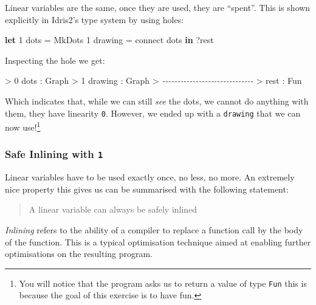 \documentclass[
]{article}
\newenvironment{Shaded}{}{}
\newcommand{\CommentTok}[1]{\textcolor[rgb]{0.38,0.63,0.69}{\textit{#1}}}
\newcommand{\DataTypeTok}[1]{\textcolor[rgb]{0.56,0.13,0.00}{#1}}
\newcommand{\DecValTok}[1]{\textcolor[rgb]{0.25,0.63,0.44}{#1}}
\newcommand{\KeywordTok}[1]{\textcolor[rgb]{0.00,0.44,0.13}{\textbf{#1}}}
\newcommand{\NormalTok}[1]{#1}
\newcommand{\OperatorTok}[1]{\textcolor[rgb]{0.40,0.40,0.40}{#1}}
\newcommand{\OtherTok}[1]{\textcolor[rgb]{0.00,0.44,0.13}{#1}}
\begin{document}
Linear variables are the same, once they are used, they are ``spent''.
This is shown explicitly in Idris2's type system by using holes:

\begin{Shaded}
\begin{Highlighting}[]
\KeywordTok{let} \DecValTok{1}\NormalTok{ dots }\OtherTok{=} \DataTypeTok{MkDots}
    \DecValTok{1}\NormalTok{ drawing }\OtherTok{=}\NormalTok{ connect dots }\KeywordTok{in}
    \OperatorTok{?}\NormalTok{rest}
\end{Highlighting}
\end{Shaded}

Inspecting the hole we get:

\begin{Shaded}
\begin{Highlighting}[]
\OperatorTok{\textgreater{}}  \DecValTok{0}\NormalTok{ dots }\OperatorTok{:} \DataTypeTok{Graph}
\OperatorTok{\textgreater{}}  \DecValTok{1}\NormalTok{ drawing }\OperatorTok{:} \DataTypeTok{Graph}
\OperatorTok{\textgreater{}} \CommentTok{{-}{-}{-}{-}{-}{-}{-}{-}{-}{-}{-}{-}{-}{-}{-}{-}{-}{-}{-}{-}{-}{-}{-}{-}{-}{-}{-}{-}{-}{-}}
\OperatorTok{\textgreater{}}\NormalTok{ rest }\OperatorTok{:} \DataTypeTok{Fun}
\end{Highlighting}
\end{Shaded}

Which indicates that, while we can still \emph{see} the dots, we cannot
do anything with them, they have linearity \texttt{0}. However, we ended
up with a \texttt{drawing} that we can now use!\footnote{You will notice
  that the program asks us to return a value of type \texttt{Fun} this
  is because the goal of this exercise is to have fun.}

\hypertarget{safe-inlining-with-1}{%
\subsubsection{\texorpdfstring{Safe Inlining with
\texttt{1}}{Safe Inlining with 1}}\label{safe-inlining-with-1}}

Linear variables have to be used exactly once, no less, no more. An
extremely nice property this gives us can be summarised with the
following statement:

\begin{quote}
A linear variable can always be safely inlined
\end{quote}

\emph{Inlining} refers to the ability of a compiler to replace a
function call by the body of the function. This is a typical
optimisation technique aimed at enabling further optimisations on the
resulting program.
\end{document}

